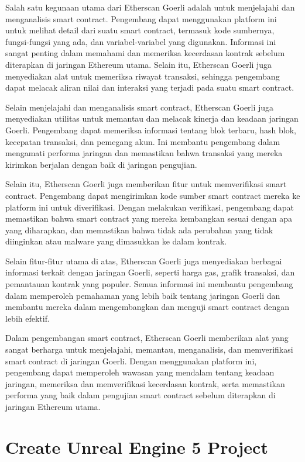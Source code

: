 Salah satu kegunaan utama dari Etherscan Goerli adalah untuk menjelajahi dan menganalisis smart contract. Pengembang dapat menggunakan platform ini untuk melihat detail dari suatu smart contract, termasuk kode sumbernya, fungsi-fungsi yang ada, dan variabel-variabel yang digunakan. Informasi ini sangat penting dalam memahami dan memeriksa kecerdasan kontrak sebelum diterapkan di jaringan Ethereum utama. Selain itu, Etherscan Goerli juga menyediakan alat untuk memeriksa riwayat transaksi, sehingga pengembang dapat melacak aliran nilai dan interaksi yang terjadi pada suatu smart contract.

Selain menjelajahi dan menganalisis smart contract, Etherscan Goerli juga menyediakan utilitas untuk memantau dan melacak kinerja dan keadaan jaringan Goerli. Pengembang dapat memeriksa informasi tentang blok terbaru, hash blok, kecepatan transaksi, dan pemegang akun. Ini membantu pengembang dalam mengamati performa jaringan dan memastikan bahwa transaksi yang mereka kirimkan berjalan dengan baik di jaringan pengujian.

Selain itu, Etherscan Goerli juga memberikan fitur untuk memverifikasi smart contract. Pengembang dapat mengirimkan kode sumber smart contract mereka ke platform ini untuk diverifikasi. Dengan melakukan verifikasi, pengembang dapat memastikan bahwa smart contract yang mereka kembangkan sesuai dengan apa yang diharapkan, dan memastikan bahwa tidak ada perubahan yang tidak diinginkan atau malware yang dimasukkan ke dalam kontrak.

Selain fitur-fitur utama di atas, Etherscan Goerli juga menyediakan berbagai informasi terkait dengan jaringan Goerli, seperti harga gas, grafik transaksi, dan pemantauan kontrak yang populer. Semua informasi ini membantu pengembang dalam memperoleh pemahaman yang lebih baik tentang jaringan Goerli dan membantu mereka dalam mengembangkan dan menguji smart contract dengan lebih efektif.

Dalam pengembangan smart contract, Etherscan Goerli memberikan alat yang sangat berharga untuk menjelajahi, memantau, menganalisis, dan memverifikasi smart contract di jaringan Goerli. Dengan menggunakan platform ini, pengembang dapat memperoleh wawasan yang mendalam tentang keadaan jaringan, memeriksa dan memverifikasi kecerdasan kontrak, serta memastikan performa yang baik dalam pengujian smart contract sebelum diterapkan di jaringan Ethereum utama.

\section{Create Unreal Engine 5 Project}

